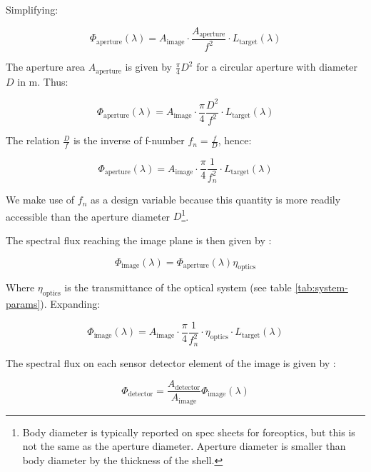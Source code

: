 \documentclass{article}
\begin{document}
Simplifying:

\begin{equation}
    \Phi_{\text{aperture}}(\lambda) = A_{\text{image}} \cdot \frac{A_{\text{aperture}}}{f^2} \cdot L_{\text{target}}(\lambda)
\end{equation}

The aperture area $A_{\text{aperture}}$ is given by $\frac{\pi}{4}D^2$ for a circular aperture with diameter $D$ in \si{\meter}. Thus:

\begin{equation}
    \Phi_{\text{aperture}}(\lambda) = A_{\text{image}} \cdot \frac{\pi}{4}\frac{D^2}{f^2} \cdot L_{\text{target}}(\lambda)
\end{equation}

The relation $\frac{D}{f}$ is the inverse of f-number $f_n = \frac{f}{D}$, hence:

\begin{equation} \label{eq:flux-aperture-3}
    \Phi_{\text{aperture}}(\lambda) = A_{\text{image}} \cdot \frac{\pi}{4}\frac{1}{f_n^2} \cdot L_{\text{target}}(\lambda)
\end{equation}

We make use of $f_n$ as a design variable because this quantity is more readily accessible than the aperture diameter $D$\footnote{Body diameter is typically reported on spec sheets for foreoptics, but this is not the same as the aperture diameter. Aperture diameter is smaller than body diameter by the thickness of the shell.}.


The spectral flux reaching the image plane is then given by \cite{Fiete2001-kz}:

\begin{equation}
    \Phi_{\text{image}}(\lambda) = \Phi_{\text{aperture}}(\lambda) \eta_{\text{optics}}
\end{equation}

Where $\eta_{\text{optics}}$ is the transmittance of the optical system (see table \ref{tab:system-params}). Expanding:

\begin{equation}
    \Phi_{\text{image}}(\lambda) = A_{\text{image}} \cdot \frac{\pi}{4}\frac{1}{f_n^2} \cdot \eta_{\text{optics}} \cdot L_{\text{target}}(\lambda)
\end{equation}

The spectral flux on each sensor detector element of the image is given by \cite{Fiete2001-kz}:

\begin{equation}
    \Phi_{\text{detector}} = \frac{A_{\text{detector}}}{A_{\text{image}}} \Phi_{\text{image}}(\lambda) 
\end{equation}
\end{document}

